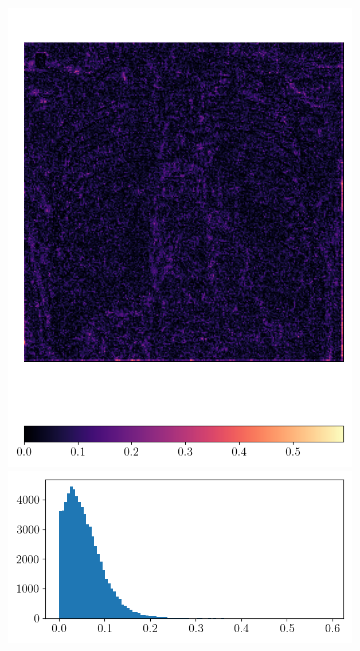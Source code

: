 \documentclass[12pt]{article}
\begin{document}
\begin{figure}[H]
  \centering
  \begin{subfigure}{0.48\textwidth}
  \includegraphics[width=1\linewidth]{images//chest_xray/ex_2/lambda_map.png}
  \includegraphics[width=1\linewidth]{images//chest_xray/ex_2/lambda_map_values_histogram.png}\

\end{subfigure}
\end{figure}
\end{document}
